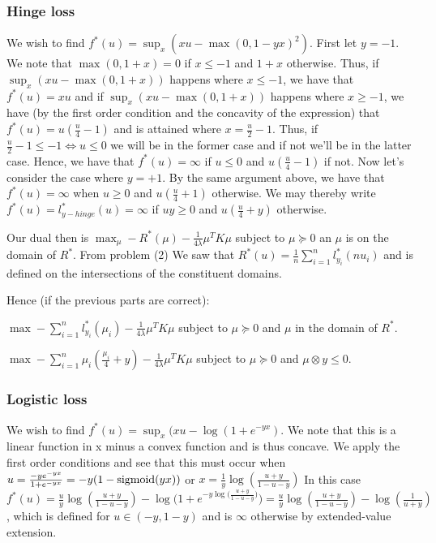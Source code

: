 \documentclass[12pt]{article}
\begin{document}
\subsubsection{Hinge loss}
We wish to find $f^*(u) = \sup_x (xu - \max(0, 1-yx)^2)$. First let $y=-1$. We note that $\max(0, 1+x) = 0$ if $x\leq -1$ and $1+x$ otherwise. Thus, if $\sup_x (xu-\max(0,1+x))$ happens where $x \leq -1$, we have that $f^*(u) = xu$ and if $\sup_x (xu-\max(0,1+x))$ happens where $x \geq -1$, we have (by the first order condition and the concavity of the expression) that $f^*(u) = u(\frac{u}{4} -1)$ and is attained where $x = \frac{u}{2} -1$. Thus, if $\frac{u}{2} -1 \leq -1 \iff u\leq 0$ we will be in the former case and if not we'll be in the latter case. Hence, we have that $f^*(u) = \infty $ if $u \leq 0$ and $u(\frac{u}{4}-1)$ if not. Now let's consider the case where $y=+1$. By the same argument above, we have that $f^*(u) = \infty$ when $u \geq 0$ and $u(\frac{u}{4} + 1)$ otherwise. We may thereby write $f^*(u) = l_{y-hinge}^*(u) = \infty$ if $uy\geq 0$ and $u(\frac{u}{4} + y)$ otherwise.

Our dual then is $\max_\mu -R^*(\mu) - \frac{1}{4\lambda} \mu^T K \mu$ subject to $\mu \succeq 0$ an $\mu$ is on the domain of $R^*$. From problem (2) We saw that $R^*(u) = \frac{1}{n} \sum_{i=1}^n l^*_{y_i}(nu_i)$ and is defined on the intersections of the constituent domains.

Hence (if the previous parts are correct):

$\max - \sum_{i=1}^n  l^*_{y_i}(\mu_i)  - \frac{1}{4\lambda} \mu^T K \mu$ subject to $\mu \succeq 0$ and $\mu$ in the domain of $R^*$. 

$\max - \sum_{i=1}^n  \mu_i(\frac{\mu_i}{4} + y) - \frac{1}{4\lambda} \mu^T K \mu$ subject to $\mu \succeq 0$ and $\mu \otimes y \leq 0$. 





\subsubsection{Logistic loss}
We wish to find $f^*(u) = \sup_x(xu - \log(1+e^{-yx})$. We note that this is a linear function in x minus a convex function and is thus concave. We apply the first order conditions and see that this must occur when $u = \frac{-y e^{-yx}}{1+e^{-yx}}  = -y(1-\textnormal{sigmoid}(yx))$ or $x = \frac{1}{y} \log (\frac{u+y}{1-u-y})$ In this case $f^*(u) = \frac{u}{y}\log (\frac{u+y}{1-u-y}) - \log \big(1+ e^{-y\log \big(\frac{u+y}{1-u-y}\big)}\big) = \frac{u}{y} \log(\frac{u+y}{1-u-y}) - \log (\frac{1}{u+y})$, which is defined for $u \in (-y, 1-y)$ and is $\infty$ otherwise by extended-value extension.
\end{document}
